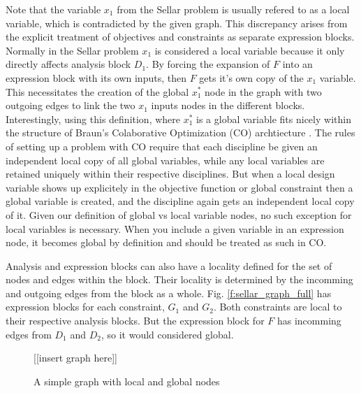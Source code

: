   Note that the variable $x_1$ from the Sellar problem is usually refered to as 
  a local variable, which is contradicted by the given graph. This discrepancy 
  arises from the explicit treatment of objectives and constraints as separate 
  expression blocks. Normally in the Sellar problem $x_1$ is considered a local 
  variable because it only directly affects analysis block $D_1$. By forcing
  the expansion of $F$ into an expression block with its own inputs, then $F$ 
  gets it's own copy of the $x_1$ variable. This necessitates the creation 
  of the global $x_1^*$ node in the graph with two outgoing edges to link the 
  two $x_1$ inputs nodes in the different blocks. Interestingly, using this 
  definition, where $x_1^*$ is a global variable fits nicely within 
  the structure of Braun's Colaborative Optimization (CO) archtiecture \cite{braun_thesis}. 
  The rules of setting up a problem with CO require that each discipline be 
  given an independent local copy of all global variables, while any local 
  variables are retained uniquely within their respective disciplines. But 
  when a local design variable shows up explicitely in the objective function 
  or global constraint then a global variable is created, and the discipline again 
  gets an independent local copy of it. Given our definition of global vs local
  variable nodes, no such exception for local variables is necessary. When you 
  include a given variable in an expression node, it becomes global by definition 
  and should be treated as such in CO. 

  Analysis and expression blocks can also have a locality defined for the set of 
  nodes and edges within the block. Their locality is determined by the 
  incomming and outgoing edges from the block as a whole. Fig. \ref{f:sellar_graph_full} has expression blocks for each constraint, $G_1$ and $G_2$. Both constraints are 
  local to their respective analysis blocks. But the expression block for $F$ 
  has incomming edges from $D_1$ and $D_2$, so it would considered global. 

  \begin{figure}
      \begin{center}
      [[insert graph here]]
      \caption{A simple graph with local and global nodes \label{f:local_global}}
      \end{center}
  \end{figure}

